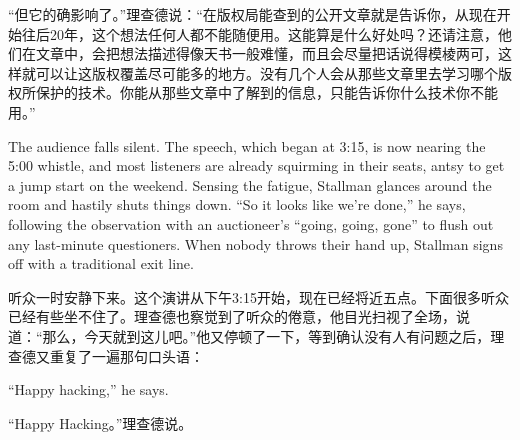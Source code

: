 \ifdefined\chs
“但它的确影响了。”理查德说：“在版权局能查到的公开文章就是告诉你，从现在开始往后20年，这个想法任何人都不能随便用。这能算是什么好处吗？还请注意，他们在文章中，会把想法描述得像天书一般难懂，而且会尽量把话说得模棱两可，这样就可以让这版权覆盖尽可能多的地方。没有几个人会从那些文章里去学习哪个版权所保护的技术。你能从那些文章中了解到的信息，只能告诉你什么技术你不能用。”
\fi

\ifdefined\eng
The audience falls silent. The speech, which began at 3:15, is now nearing the 5:00 whistle, and most listeners are already squirming in their seats, antsy to get a jump start on the weekend. Sensing the fatigue, Stallman glances around the room and hastily shuts things down. ``So it looks like we're done,'' he says, following the observation with an auctioneer's ``going, going, gone'' to flush out any last-minute questioners. When nobody throws their hand up, Stallman signs off with a traditional exit line.
\fi

\ifdefined\chs
听众一时安静下来。这个演讲从下午3:15开始，现在已经将近五点。下面很多听众已经有些坐不住了。理查德也察觉到了听众的倦意，他目光扫视了全场，说道：“那么，今天就到这儿吧。”他又停顿了一下，等到确认没有人有问题之后，理查德又重复了一遍那句口头语：
\fi

\ifdefined\eng
``Happy hacking,'' he says.
\fi

\ifdefined\chs
“Happy Hacking。”理查德说。
\fi

\theendnotes
\setcounter{endnote}{0}
